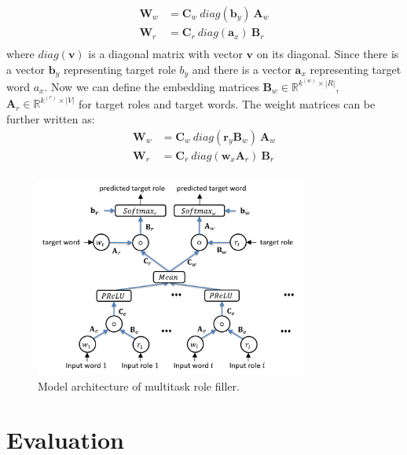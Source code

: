 \documentclass[a4paper]{article}
\begin{document}
\begin{equation} \label{eq:cls}
\begin{aligned}
    \mathbf{W}_w
        &= \mathbf{C}_w \ diag(\mathbf{b}_y) \ \mathbf{A}_w \\
    \mathbf{W}_r
        &= \mathbf{C}_r \ diag(\mathbf{a}_x) \ \mathbf{B}_r \\
\end{aligned}
\end{equation}
where $diag(\mathbf{v})$ is a diagonal matrix with vector $\mathbf{v}$ on its diagonal. Since there is a vector $\mathbf{b}_y$ representing target role $b_y$ and there is a vector $\mathbf{a}_x$ representing target word $a_x$. Now we can define the embedding matrices $\mathbf{B}_w \in \mathbb{R}^{k^{(w)} \times |R|}$, $\mathbf{A}_r \in \mathbb{R}^{k^{(r)} \times |V|}$ for target roles and target words. The weight matrices can be further written as: 
\begin{equation} \label{eq:cls_temb}
\begin{aligned}
    \mathbf{W}_w
        &= \mathbf{C}_w \ diag(\mathbf{r}_y \mathbf{B}_w) \ \mathbf{A}_w \\
    \mathbf{W}_r
        &= \mathbf{C}_r \ diag(\mathbf{w}_x \mathbf{A}_r) \ \mathbf{B}_r \\
\end{aligned}
\end{equation}



\begin{figure}[t]
\centering
\includegraphics[width=0.8\textwidth]{BOP.png}
\caption{\label{fig:BOP} Model architecture of multitask role filler.}
\end{figure}




\section{Evaluation}
\end{document}
